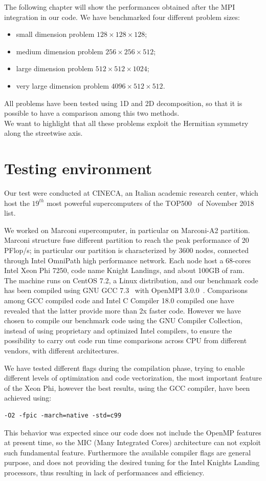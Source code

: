 The following chapter will show the performances obtained after the MPI integration in our code.
We have benchmarked four different problem sizes:
\begin{itemize}
\item small dimension problem $128\times 128 \times 128$;
\item medium dimension problem $256\times 256\times 512$;
\item large dimension problem $512\times 512\times 1024$;
\item very large dimension problem $4096\times 512\times 512$.  
\end{itemize}
All problems have been tested using 1D and 2D decomposition, so that it is possible to have a comparison among this two methods.
\\
We want to highlight that all these problems exploit the Hermitian symmetry along the streetwise axis.
\section{Testing environment}
Our test were conducted at CINECA\cite{Cineca}, an Italian academic research center, which host the $19^{th}$ most powerful supercomputers of the TOP500~\cite{top500} of November 2018 list.

We worked on Marconi\cite{marconi:specs} supercomputer, in particular on Marconi-A2 partition.
Marconi structure fuse different partition to reach the peak performance of 20 PFlop/s; in particular our partition is characterized by 3600 nodes, connected through Intel OmniPath\cite{intel:intelmpivsopenmpi} high performance network. Each node host a 68-cores Intel Xeon Phi 7250, code name Knight Landings, and about 100GB of ram. \\
The machine runs on CentOS 7.2, a Linux distribution, and our benchmark code has been compiled using GNU GCC 7.3~\cite{gcc} with OpenMPI 3.0.0~\cite{openmpi}\cite{MPI:standard3}. Comparisons among GCC compiled code and Intel C Compiler 18.0 compiled one have revealed that the latter provide more than 2x faster code. However we have chosen to compile our benchmark code using the GNU Compiler Collection, instead of using proprietary and optimized Intel compilers, to ensure the possibility to carry out code run time comparisons across CPU from different vendors, with different architectures. 
\par
We have tested different flags during the compilation phase, trying to enable different levels of optimization and code vectorization, the most important feature of the Xeon Phi, however the best results, using the GCC compiler, have been achieved using:
\begin{lstlisting}
-O2 -fpic -march=native -std=c99
\end{lstlisting}
This behavior was expected since our code does not include the OpenMP\cite{openmp} features at present time, so the MIC\cite{mic} (Many Integrated Cores) architecture can not exploit such fundamental feature. Furthermore the available compiler flags are general purpose, and does not providing the desired tuning for the Intel Knights Landing processors, thus resulting in lack of performances and efficiency.


